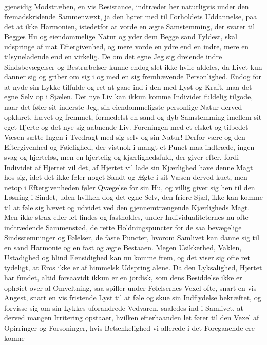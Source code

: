 \documentclass[12pt,a4paper]{book}
\newcommand{\apage}[1]{\marginnote{\footnotesize\textit{[#1]}}}
\begin{document}
gjensidig Modstræben, en vis Resistance, indtræder her naturligvis under
den fremadskridende Sammenvæxt, ja den hører med til Forholdets
Uddannelse, paa det at ikke Harmonien, istedetfor at vorde en ægte
Samstemming, der svarer til Begges Hu og eiendommelige Natur og yder dem
Begge sand Fyldest, skal udspringe af mat Eftergivenhed, og mere vorde en
ydre end en indre, mere en tilsyneladende end en virkelig. De om det
egne Jeg sig dreiende indre Sindsbevægelser og Bestræbelser kunne endog
slet ikke hvile aldeles, da Livet \apage{115} kun danner sig og griber om sig i og
med en sig fremhævende Personlighed. Endog for at nyde sin Lykke
tilfulde og ret at gaae ind i den med Lyst og Kraft, maa det egne Selv
op i Sjælen. Det nye Liv kan ikkun komme Individet fuldelig tilgode,
naar det føler sit inderste Jeg, sin eiendommeligste personlige Natur
derved opklaret, hævet og fremmet, formedelst en sand og dyb Samstemming
imellem sit eget Hjerte og det nye sig aabnende Liv. Foreningen med et
elsket og tilbedet Væsen sætte Ingen i Tvedragt med sig selv og sin
Natur! Derfor være og den Eftergivenhed og Føielighed, der vistnok i
mangt et Punct maa indtræde, ingen svag og hjerteløs, men en hjertelig
og kjærlighedsfuld, der giver efter, fordi Individet af Hjertet vil det,
af Hjertet vil lade sin Kjærlighed have denne Magt hos sig, idet det
ikke føler noget Sandt og Ægte i sit Væsen derved kuet, men netop i
Eftergivenheden føler Qvægelse for sin Hu, og villig giver sig hen til
den Løsning i Sindet, uden hvilken dog det egne Selv, den friere Sjæl,
ikke kan komme til at føle sig hævet og udvidet ved den gjennemtrængende
Kjærligheds Magt. Men ikke strax eller let findes og fastholdes, under
Individualiteternes nu ofte indtrædende Sammenstød, de rette
Holdningspuncter for de saa bevægelige Sindsstemninger og Følelser, de
faste Puncter, hvorom Samlivet kan danne sig til en sand Harmonie og en
fast og ægte Bestaaen. Megen Usikkerhed, Vaklen, Ustadighed og blind
Eensidighed kan nu komme frem, og det \apage{116} viser sig ofte ret tydeligt, at
Eros ikke er af himmelsk Udspring alene. Da den Lyksalighed, Hjertet har
fundet, altid forsaavidt ikkun er en jordisk, som dens Besiddelse ikke
er ophøiet over al Omveltning, saa spiller under Følelsernes Vexel ofte,
snart en vis Angest, snart en vis fristende Lyst til at føle og skue sin
Indflydelse bekræftet, og forvisse sig om sin Lykkes uforandrede
Vedvaren, saaledes ind i Samlivet, at derved mangen Irritering opstaaer,
hvilken efterhaanden let fører til den Vexel af Opirringer og
Forsoninger, hvis Betænkelighed vi allerede i det Foregaaende ere komne
\end{document}
